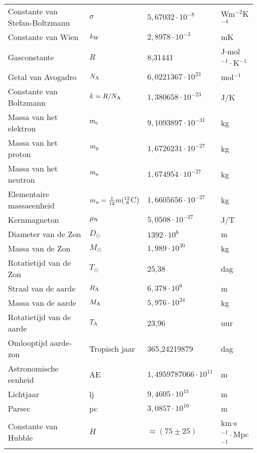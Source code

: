 \begin{center}
\begin{tabular}{||l|lll||}
\hline
Constante van Stefan-Boltzmann &$\sigma$&$5,67032\cdot10^{-8}$&Wm$^{-2}$K$^{-4}$\rule{0pt}{13pt}\\
Constante van Wien             &$k_{\rm W}$&$2,8978\cdot10^{-3}$&mK\\
\hline
Gasconstante                   &$R$&8,31441&J$\cdot$mol$^{-1}\cdot$K$^{-1}$\\
Getal van Avogadro             &$N_{\rm A}$&$6,0221367\cdot10^{23}$&mol$^{-1}$\\
Constante van Boltzmann        &$k=R/N_{\rm A}$&$1,380658\cdot10^{-23}$&J/K\\
\hline
Massa van het elektron         &$m_{\rm e}$&$9,1093897\cdot10^{-31}$&kg\rule{0pt}{13pt}\\
Massa van het proton           &$m_{\rm p}$&$1,6726231\cdot10^{-27}$&kg\\
Massa van het neutron          &$m_{\rm n}$&$1,674954\cdot10^{-27}$&kg\\
Elementaire massaeenheid       &$m_{\rm u}=\frac{1}{12}m(^{12}_{~6}$C)&$1,6605656\cdot10^{-27}$&kg\\
Kernmagneton                   &$\mu_{\rm N}$&$5,0508\cdot10^{-27}$&J/T\\
\hline
Diameter van de Zon            &$D_\odot$&$1392\cdot10^6$&m\rule{0pt}{13pt}\\
Massa van de Zon               &$M_\odot$&$1,989\cdot10^{30}$&kg\\
Rotatietijd van de Zon         &$T_\odot$&25,38&dag\\
Straal van de aarde            &$R_{\rm A}$&$6,378\cdot10^6$&m\\
Massa van de aarde             &$M_{\rm A}$&$5,976\cdot10^{24}$&kg\\
Rotatietijd van de aarde       &$T_{\rm A}$&23,96&uur\\
Omlooptijd aarde-zon           &Tropisch jaar&365,24219879&dag\\
Astronomische eenheid          &AE&$1,4959787066\cdot10^{11}$&m\\
Lichtjaar                      &lj&$9,4605\cdot10^{15}$&m\\
Parsec                         &pc&$3,0857\cdot10^{16}$&m\\
Constante van Hubble           &$H$&$\approx(75\pm25)$&km$\cdot$s$^{-1}\cdot$Mpc$^{-1}$\\
\hline
\end{tabular}
\end{center}

\renewcommand{\chaptermark}[1]{\markboth{#1}{#1}}

